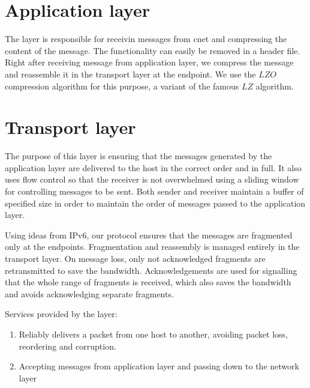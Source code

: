 \documentclass[11pt,a4paper,oneside]{report}
\begin{document}
\section*{Application layer} The layer is responsible for receivin messages from
cnet and compressing the content of the message. The functionality can easily be
removed in a header file. Right after receiving message from application layer,
we compress the message and reassemble it in the transport layer at the
endpoint. We use the $LZO$ compression algorithm for this purpose, a variant of
the famous $LZ$ algorithm.

\section*{Transport layer} 
The purpose of this layer is ensuring that the messages generated by the
application layer are delivered to the host in the correct order and in full.
It also uses flow control so that the receiver is not overwhelmed using a
sliding window for controlling messages to be sent. Both sender and receiver 
maintain a buffer of specified size in order to maintain the order of messages 
passed to the application layer.

Using ideas from IPv6, our protocol ensures that the messages are fragmented
only at the endpoints. Fragmentation and reassembly is managed entirely in the
transport layer. On message loss, only not acknowledged fragments are
retransmitted to save the bandwidth. Acknowledgements are used for signalling
that the whole range of fragments is received, which also saves the bandwidth
and avoids acknowledging separate fragments.
    
Services provided by the layer:
\begin{enumerate}
  \item Reliably delivers a packet from one host to another, avoiding
   packet loss, reordering and corruption.
   \item Accepting messages from application layer and passing down to the
   network layer
\end{enumerate}
\end{document}
